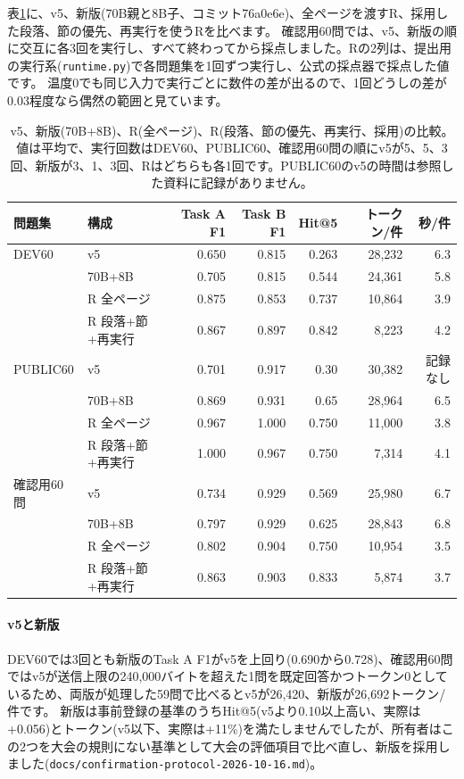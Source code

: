 \documentclass[10pt,a4paper]{ltjsarticle}
\begin{document}
表\ref{tab:results}に、v5、新版(70B親と8B子、コミット76a0e6e)、全ページを渡すR、採用した段落、節の優先、再実行を使うRを比べます。
確認用60問では、v5、新版の順に交互に各3回を実行し、すべて終わってから採点しました。Rの2列は、提出用の実行系(\texttt{runtime.py})で各問題集を1回ずつ実行し、公式の採点器で採点した値です。
温度0でも同じ入力で実行ごとに数件の差が出るので、1回どうしの差が0.03程度なら偶然の範囲と見ています。

\begin{table}[t]
  \centering
  \caption{v5、新版(70B+8B)、R(全ページ)、R(段落、節の優先、再実行、採用)の比較。値は平均で、実行回数はDEV60、PUBLIC60、確認用60問の順にv5が5、5、3回、新版が3、1、3回、Rはどちらも各1回です。PUBLIC60のv5の時間は参照した資料に記録がありません。}
  \label{tab:results}
  \small
  \begin{tabular}{llrrrrr}
    \toprule
    問題集 & 構成 & Task A F1 & Task B F1 & Hit@5 & トークン/件 & 秒/件 \\
    \midrule
    DEV60 & v5 & 0.650 & 0.815 & 0.263 & 28,232 & 6.3 \\
     & 70B+8B & 0.705 & 0.815 & 0.544 & 24,361 & 5.8 \\
     & R 全ページ & 0.875 & 0.853 & 0.737 & 10,864 & 3.9 \\
     & R 段落+節+再実行 & 0.867 & 0.897 & 0.842 & 8,223 & 4.2 \\
    \midrule
    PUBLIC60 & v5 & 0.701 & 0.917 & 0.30 & 30,382 & 記録なし \\
     & 70B+8B & 0.869 & 0.931 & 0.65 & 28,964 & 6.5 \\
     & R 全ページ & 0.967 & 1.000 & 0.750 & 11,000 & 3.8 \\
     & R 段落+節+再実行 & 1.000 & 0.967 & 0.750 & 7,314 & 4.1 \\
    \midrule
    確認用60問 & v5 & 0.734 & 0.929 & 0.569 & 25,980 & 6.7 \\
     & 70B+8B & 0.797 & 0.929 & 0.625 & 28,843 & 6.8 \\
     & R 全ページ & 0.802 & 0.904 & 0.750 & 10,954 & 3.5 \\
     & R 段落+節+再実行 & 0.863 & 0.903 & 0.833 & 5,874 & 3.7 \\
    \bottomrule
  \end{tabular}
\end{table}

\paragraph{v5と新版}
DEV60では3回とも新版のTask A F1がv5を上回り(0.690から0.728)、確認用60問ではv5が送信上限の240,000バイトを超えた1問を既定回答かつトークン0としているため、両版が処理した59問で比べるとv5が26,420、新版が26,692トークン/件です。
新版は事前登録の基準のうちHit@5(v5より0.10以上高い、実際は+0.056)とトークン(v5以下、実際は+11\%)を満たしませんでしたが、所有者はこの2つを大会の規則にない基準として大会の評価項目で比べ直し、新版を採用しました(\texttt{docs/confirmation-protocol-2026-10-16.md})。
\end{document}
